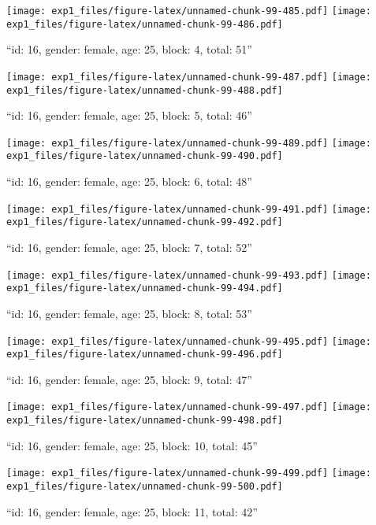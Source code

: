 \documentclass[,]{article}
\begin{document}
\texttt{[image: exp1\_files/figure-latex/unnamed-chunk-99-485.pdf]}
\texttt{[image: exp1\_files/figure-latex/unnamed-chunk-99-486.pdf]}

\newpage
[1] 

``id: 16, gender: female, age: 25, block: 4, total: 51''

\texttt{[image: exp1\_files/figure-latex/unnamed-chunk-99-487.pdf]}
\texttt{[image: exp1\_files/figure-latex/unnamed-chunk-99-488.pdf]}

\newpage
[1] 

``id: 16, gender: female, age: 25, block: 5, total: 46''

\texttt{[image: exp1\_files/figure-latex/unnamed-chunk-99-489.pdf]}
\texttt{[image: exp1\_files/figure-latex/unnamed-chunk-99-490.pdf]}

\newpage
[1] 

``id: 16, gender: female, age: 25, block: 6, total: 48''

\texttt{[image: exp1\_files/figure-latex/unnamed-chunk-99-491.pdf]}
\texttt{[image: exp1\_files/figure-latex/unnamed-chunk-99-492.pdf]}

\newpage
[1] 

``id: 16, gender: female, age: 25, block: 7, total: 52''

\texttt{[image: exp1\_files/figure-latex/unnamed-chunk-99-493.pdf]}
\texttt{[image: exp1\_files/figure-latex/unnamed-chunk-99-494.pdf]}

\newpage
[1] 

``id: 16, gender: female, age: 25, block: 8, total: 53''

\texttt{[image: exp1\_files/figure-latex/unnamed-chunk-99-495.pdf]}
\texttt{[image: exp1\_files/figure-latex/unnamed-chunk-99-496.pdf]}

\newpage
[1] 

``id: 16, gender: female, age: 25, block: 9, total: 47''

\texttt{[image: exp1\_files/figure-latex/unnamed-chunk-99-497.pdf]}
\texttt{[image: exp1\_files/figure-latex/unnamed-chunk-99-498.pdf]}

\newpage
[1] 

``id: 16, gender: female, age: 25, block: 10, total: 45''

\texttt{[image: exp1\_files/figure-latex/unnamed-chunk-99-499.pdf]}
\texttt{[image: exp1\_files/figure-latex/unnamed-chunk-99-500.pdf]}

\newpage
[1] 

``id: 16, gender: female, age: 25, block: 11, total: 42''
\end{document}
